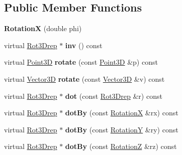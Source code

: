 \subsection*{Public Member Functions}
\begin{DoxyCompactItemize}
\item 
\mbox{\label{classRotationX_ae701e6d326874b3e65c2ee0a946c97af}} 
{\bfseries RotationX} (double phi)
\item 
\mbox{\label{classRotationX_a93e9e5772a113de6da619096706f3b12}} 
virtual \hyperlink{classRot3Drep}{Rot3\+Drep} $\ast$ {\bfseries inv} () const
\item 
\mbox{\label{classRotationX_a5ed32c1643e9689e61be37a4179626c3}} 
virtual \hyperlink{classTVec3D}{Point3D} {\bfseries rotate} (const \hyperlink{classTVec3D}{Point3D} \&p) const
\item 
\mbox{\label{classRotationX_af79dc26cef3cbe899de0506e6d9a6152}} 
virtual \hyperlink{classTVec3D}{Vector3D} {\bfseries rotate} (const \hyperlink{classTVec3D}{Vector3D} \&v) const
\item 
\mbox{\label{classRotationX_a7b8794fafa0727d2ac80f6207986c474}} 
virtual \hyperlink{classRot3Drep}{Rot3\+Drep} $\ast$ {\bfseries dot} (const \hyperlink{classRot3Drep}{Rot3\+Drep} \&r) const
\item 
\mbox{\label{classRotationX_a3a3002acfb348c4802452215feb14a6b}} 
virtual \hyperlink{classRot3Drep}{Rot3\+Drep} $\ast$ {\bfseries dot\+By} (const \hyperlink{classRotationX}{RotationX} \&rx) const
\item 
\mbox{\label{classRotationX_a01c159ba4d583c41115d5cfb9e081918}} 
virtual \hyperlink{classRot3Drep}{Rot3\+Drep} $\ast$ {\bfseries dot\+By} (const \hyperlink{classRotationY}{RotationY} \&ry) const
\item 
\mbox{\label{classRotationX_a6569b4dfb35a3c538868a6eb7cf8e1aa}} 
virtual \hyperlink{classRot3Drep}{Rot3\+Drep} $\ast$ {\bfseries dot\+By} (const \hyperlink{classRotationZ}{RotationZ} \&rz) const
\item 
\mbox{\label{classRotationX_abc94c0410bcd747a6c3ef342565f4f6b}} 

\end{DoxyCompactItemize}
